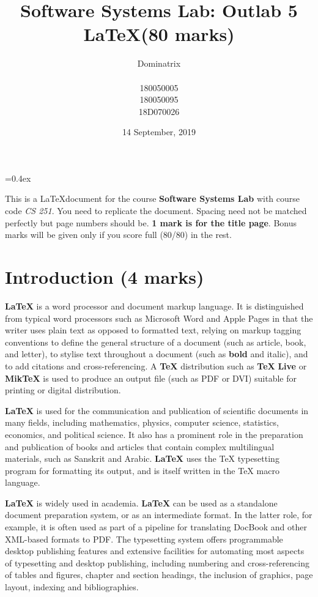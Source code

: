 \documentclass[12pt]{article}
\title{\vspace*{55mm}\Huge\textbf{Software Systems Lab: Outlab 5} \\ \textbf{\LaTeX (80 marks)}}
\author{\huge Dominatrix \\ \\ \large 180050005 \\ 180050095 \\ 18D070026}
\date{14 September, 2019}
\newcommand{\LATEX}{\LaTeX}
\begin{document}
\font=0.4ex

\begin{titlingpage}
	\maketitle
\end{titlingpage}
\newpage
\tableofcontents


\newpage

 This is a \LaTeX document for the course \textbf{Software Systems Lab} with course code \textit{CS 251}. You need to replicate the document. Spacing need not be matched perfectly but page numbers should be. \textbf{1 mark is for the title page}. Bonus marks will be given only if you score full (80/80) in the rest.

 
\section{ Introduction (4 marks) }%
\indent


\textbf{\LaTeX} is a word processor and document markup language. It is distinguished from typical word processors such as Microsoft Word and Apple Pages in that the writer uses plain text as opposed to formatted text, relying on markup tagging conventions to define the general structure of a document (such as article, book, and letter), to stylise text throughout a document (such as \textbf{bold} and italic), and to add citations and cross-referencing. A \textbf{\TeX} distribution such as \textbf{\TeX} \textbf{Live} or \textbf{MikTeX} is used to produce an output file (such as PDF or DVI)
suitable for printing or digital distribution.
\newline

 
\textbf{\LaTeX} is used for the communication and publication of scientific documents
in many fields, including mathematics, physics, computer science, statistics,
economics, and political science. It also has a prominent role in the preparation
and publication of books and articles that contain complex multilingual materials, such as Sanskrit and Arabic. \textbf{\LATEX} uses the TeX typesetting program for
formatting its output, and is itself written in the TeX macro language.
\newline


\textbf{\LaTeX} is widely used in academia. \textbf{\LaTeX} can be used as a standalone document preparation system, or as an intermediate format. In the latter role, for
example, it is often used as part of a pipeline for translating DocBook and other
XML-based formats to PDF. The typesetting system offers programmable desktop publishing features and extensive facilities for automating most aspects of
typesetting and desktop publishing, including numbering and cross-referencing
of tables and figures, chapter and section headings, the inclusion of graphics,
page layout, indexing and bibliographies.\newline
\par
\end{document}

